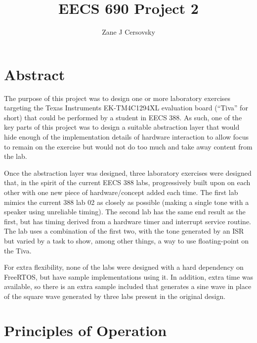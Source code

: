 \documentclass[titlepage]{article}
\title{EECS 690 Project 2}
\author{Zane J Cersovsky}
\begin{document}
\maketitle

\section{Abstract} 
The purpose of this project was to design one or more laboratory exercises targeting the Texas Instruments EK-TM4C1294XL
evaluation board (``Tiva\textregistered'' for short) that could be performed by a student in EECS 388. As such, one of 
the key parts of this project was to design a suitable abstraction layer that would hide enough of the implementation 
details of hardware interaction to allow focus to remain on the exercise but would not do too much and take away 
content from the lab.

Once the abstraction layer was designed, three laboratory exercises were designed that, in the spirit of the current 
EECS 388 labs, progressively built upon on each other with one new piece of hardware/concept added each time. The first lab 
mimics the current 388 lab 02 as closely as possible (making a single tone with a speaker using unreliable timing). The second 
lab has the same end result as the first, but has timing derived from a hardware timer and interrupt service routine. The 
lab uses a combination of the first two, with the tone generated by an ISR but varied by a task to show, among other things, 
a way to use floating-point on the Tiva\textregistered.

For extra flexibility, none of the labs were designed with a hard dependency on FreeRTOS\textregistered, but have sample 
implementations using it. In addition, extra time was available, so there is an extra sample included that generates a 
sine wave in place of the square wave generated by three labs present in the original design.

\pagebreak
\tableofcontents
\pagebreak
\listoffigures
\pagebreak
\listoftables
\pagebreak

\section{Principles of Operation}
\end{document}
